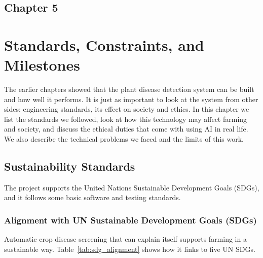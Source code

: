 \begin{center}
    \section*{\fontsize{20}{20}\selectfont Chapter 5}
\end{center}
\vspace{10mm}

\section{Standards, Constraints, and Milestones}

The earlier chapters showed that the plant disease detection system can be built and how well it performs. It is just as important to look at the system from other sides: engineering standards, its effect on society and ethics. In this chapter we list the standards we followed, look at how this technology may affect farming and society, and discuss the ethical duties that come with using AI in real life. We also describe the technical problems we faced and the limits of this work.

\subsection{Sustainability Standards}
The project supports the United Nations Sustainable Development Goals (SDGs), and it follows some basic software and testing standards.

\subsubsection*{Alignment with UN Sustainable Development Goals (SDGs)}
Automatic crop disease screening that can explain itself supports farming in a sustainable way. Table~\ref{tab:sdg_alignment} shows how it links to five UN SDGs.

